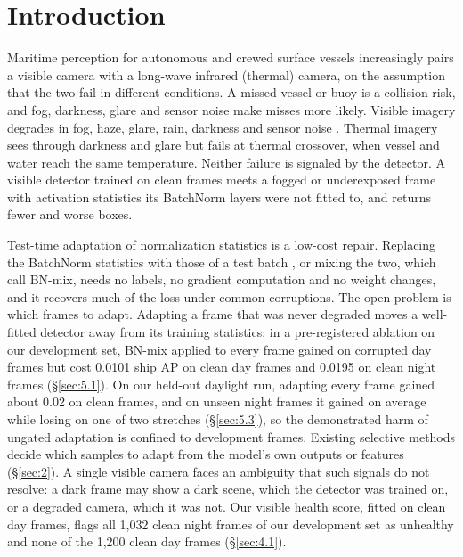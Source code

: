 \documentclass[10pt]{article}
\begin{document}
\section{Introduction}\label{sec:1}
Maritime perception for autonomous and crewed surface vessels increasingly pairs a visible camera with a long-wave infrared (thermal) camera, on the assumption that the two fail in different conditions. A missed vessel or buoy is a collision risk, and fog, darkness, glare and sensor noise make misses more likely. Visible imagery degrades in fog, haze, glare, rain, darkness and sensor noise \citep{prasad2017video}. Thermal imagery sees through darkness and glare but fails at thermal crossover, when vessel and water reach the same temperature. Neither failure is signaled by the detector. A visible detector trained on clean frames meets a fogged or underexposed frame with activation statistics its BatchNorm layers were not fitted to, and returns fewer and worse boxes.

Test-time adaptation of normalization statistics is a low-cost repair. Replacing the BatchNorm statistics with those of a test batch \citep{li2017revisiting}, or mixing the two, which \citet{schneider2020improving} call BN-mix, needs no labels, no gradient computation and no weight changes, and it recovers much of the loss under common corruptions. The open problem is which frames to adapt. Adapting a frame that was never degraded moves a well-fitted detector away from its training statistics: in a pre-registered ablation on our development set, BN-mix applied to every frame gained on corrupted day frames but cost 0.0101 ship AP on clean day frames and 0.0195 on clean night frames (\S\ref{sec:5.1}). On our held-out daylight run, adapting every frame gained about 0.02 on clean frames, and on unseen night frames it gained on average while losing on one of two stretches (\S\ref{sec:5.3}), so the demonstrated harm of ungated adaptation is confined to development frames. Existing selective methods decide which samples to adapt from the model's own outputs or features (\S\ref{sec:2}). A single visible camera faces an ambiguity that such signals do not resolve: a dark frame may show a dark scene, which the detector was trained on, or a degraded camera, which it was not. Our visible health score, fitted on clean day frames, flags all 1,032 clean night frames of our development set as unhealthy and none of the 1,200 clean day frames (\S\ref{sec:4.1}).
\end{document}
